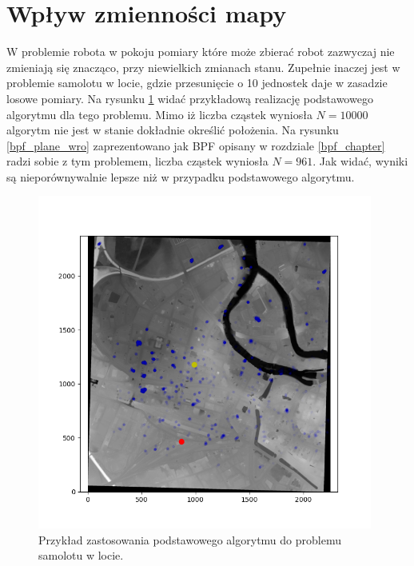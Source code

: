 \section{Wpływ zmienności mapy} \label{zmienna_mapa_chap}
W problemie robota w pokoju pomiary które może zbierać robot zazwyczaj nie zmieniają się znacząco, przy niewielkich zmianach stanu. Zupełnie inaczej jest w problemie samolotu w locie, gdzie przesunięcie o 10 jednostek daje w zasadzie losowe pomiary. Na rysunku \ref{pf_plane} widać przykładową realizację podstawowego algorytmu dla tego problemu. Mimo iż liczba cząstek wyniosła $N=10000$ algorytm nie jest w stanie dokładnie określić położenia. Na rysunku \ref{bpf_plane_wro} zaprezentowano jak BPF opisany w rozdziale \ref{bpf_chapter} radzi sobie z tym problemem, liczba cząstek wyniosła $N=961$. Jak widać, wyniki są nieporównywalnie lepsze niż w przypadku podstawowego algorytmu.
\begin{figure}[H]
	\begin{center}
		\includegraphics[width=11cm]{./pf_plane.png}
		\caption{Przykład zastosowania podstawowego algorytmu do problemu samolotu w locie.}
		\label{pf_plane}
	\end{center}
\end{figure}
